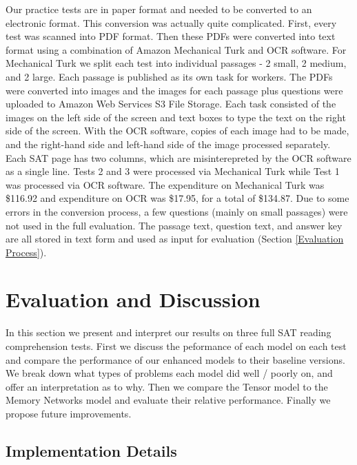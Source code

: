 \documentclass[pageno]{final_paper}
\begin{document}
Our practice tests are in paper format and needed to be converted to an
electronic format. This conversion was actually quite complicated. First, every
test was scanned into PDF format. Then these PDFs were converted into text
format using a combination of Amazon Mechanical Turk and OCR software. For
Mechanical Turk we split each test into individual passages - 2 small, 2 medium,
and 2 large. Each passage is published as its own task for workers. The PDFs
were converted into images and the images for each passage plus questions were
uploaded to Amazon Web Services S3 File Storage. Each task consisted of the
images on the left side of the screen and text boxes to type the text on the
right side of the screen. With the OCR software, copies of each image had to be
made, and the right-hand side and left-hand side of the image processed
separately. Each SAT page has two columns, which are misinterepreted by the OCR
software as a single line. Tests 2 and 3 were processed via Mechanical Turk
while Test 1 was processed via OCR software. The expenditure on Mechanical Turk
was \$116.92 and expenditure on OCR was \$17.95, for a total of \$134.87. Due to
some errors in the conversion process, a few questions (mainly on small
passages) were not used in the full evaluation. The passage text, question text,
and answer key are all stored in text form and used as input for evaluation
(Section \ref{Evaluation Process}).

\section{Evaluation and Discussion}
\label{Evaluation and Discussion}

In this section we present and interpret our results on three full SAT reading
comprehension tests. First we discuss the peformance of each model on each test
and compare the performance of our enhanced models to their baseline versions.
We break down what types of problems each model did well / poorly on, and offer
an interpretation as to why. Then we compare the Tensor model to the Memory
Networks model and evaluate their relative performance. Finally we propose
future improvements.

\subsection{Implementation Details}
\label{Implementation Details}
\end{document}
